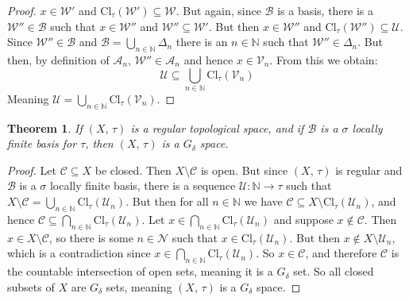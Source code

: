\documentclass{article}
\theoremstyle{plain}
\newtheorem{theorem}{Theorem}[section]
\theoremstyle{normal}
\begin{document}
\begin{proof}
            $x\in\mathcal{W}'$ and
            $\textrm{Cl}_{\tau}(\mathcal{W}')\subseteq\mathcal{W}$. But again,
            since $\mathcal{B}$ is a basis, there is a
            $\mathcal{W}''\in\mathcal{B}$ such that $x\in\mathcal{W}''$ and
            $\mathcal{W}''\subseteq\mathcal{W}'$. But then
            $x\in\mathcal{W}''$ and
            $\textrm{Cl}_{\tau}(\mathcal{W}'')\subseteq\mathcal{U}$. Since
            $\mathcal{W}''\in\mathcal{B}$ and
            $\mathcal{B}=\bigcup_{n\in\mathbb{N}}\Delta_{n}$ there is an
            $n\in\mathbb{N}$ such that $\mathcal{W}''\in\Delta_{n}$. But then,
            by definition of $\mathcal{A}_{n}$,
            $\mathcal{W}''\in\mathcal{A}_{n}$ and hence
            $x\in\mathcal{V}_{n}$. From this we obtain:
            \begin{equation}
                \mathcal{U}\subseteq\bigcup_{n\in\mathbb{N}}
                    \textrm{Cl}_{\tau}(\mathcal{V}_{n})
            \end{equation}
            Meaning
            $\mathcal{U}=\bigcup_{n\in\mathbb{N}}\textrm{Cl}_{\tau}(\mathcal{V}_{n})$.
        \end{proof}
        \begin{theorem}
            If $(X,\,\tau)$ is a regular topological space, and if
            $\mathcal{B}$ is a $\sigma$ locally finite basis for $\tau$, then
            $(X,\,\tau)$ is a $G_{\delta}$ space.
        \end{theorem}
        \begin{proof}
            Let $\mathcal{C}\subseteq{X}$ be closed. Then
            $X\setminus\mathcal{C}$ is open. But since $(X,\,\tau)$ is regular
            and $\mathcal{B}$ is a $\sigma$ locally finite basis, there is a
            sequence $\mathcal{U}:\mathbb{N}\rightarrow\tau$ such that
            $X\setminus\mathcal{C}=\bigcup_{n\in\mathbb{N}}\textrm{Cl}_{\tau}(\mathcal{U}_{n})$.
            But then for all $n\in\mathbb{N}$ we have
            $\mathcal{C}\subseteq{X}\setminus\textrm{Cl}_{\tau}(\mathcal{U}_{n})$,
            and hence
            $\mathcal{C}\subseteq\bigcap_{n\in\mathbb{N}}\textrm{Cl}_{\tau}(\mathcal{U}_{n})$.
            Let $x\in\bigcap_{n\in\mathbb{N}}\textrm{Cl}_{\tau}(\mathcal{U}_{n})$
            and suppose $x\notin\mathcal{C}$. Then
            $x\in{X}\setminus\mathcal{C}$, so there is some
            $n\in\mathcal{N}$ such that $x\in\textrm{Cl}_{\tau}(\mathcal{U}_{n})$.
            But then $x\notin{X}\setminus\mathcal{U}_{n}$, which is a
            contradiction since
            $x\in\bigcap_{n\in\mathbb{N}}\textrm{Cl}_{\tau}(\mathcal{U}_{n})$.
            So $x\in\mathcal{C}$, and therefore $\mathcal{C}$ is the countable
            intersection of open sets, meaning it is a $G_{\delta}$ set.
            So all closed subsets of $X$ are $G_{\delta}$ sets, meaning
            $(X,\,\tau)$ is a $G_{\delta}$ space.
        \end{proof}
\end{document}
